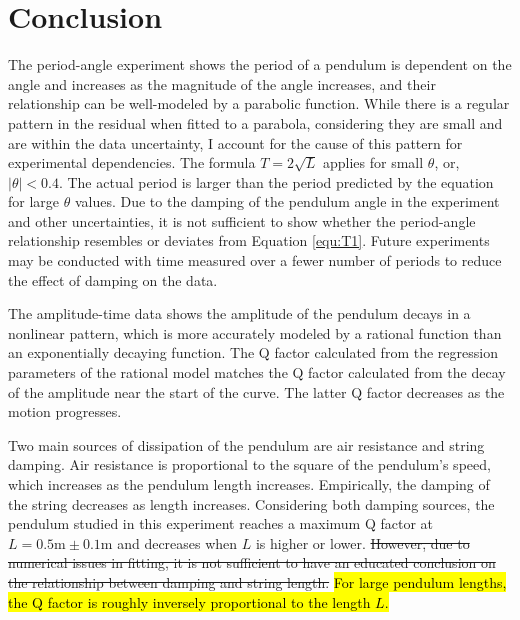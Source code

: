 \documentclass[12pt]{article}
\DeclareRobustCommand{\hlnew}[1]{{\sethlcolor{hlcnew}\hl{#1}}}
\DeclareRobustCommand{\hldel}[1]{{\st{#1}}}
\begin{document}
\section{Conclusion}

The period-angle experiment shows the period of a pendulum is dependent on the angle and increases as the magnitude of the angle increases, and their relationship can be well-modeled by a parabolic function. While there is a regular pattern in the residual when fitted to a parabola, considering they are small and are within the data uncertainty, I account for the cause of this pattern for experimental dependencies. The formula $T=2\sqrt{L}$ applies for small $\theta$, or, $|\theta|<0.4$. The actual period is larger than the period predicted by the equation for large $\theta$ values. Due to the damping of the pendulum angle in the experiment and other uncertainties, it is not sufficient to show whether the period-angle relationship resembles or deviates from Equation \ref{equ:T1}. Future experiments may be conducted with time measured over a fewer number of periods to reduce the effect of damping on the data.

The amplitude-time data shows the amplitude of the pendulum decays in a nonlinear pattern, which is more accurately modeled by a rational function than an exponentially decaying function. The Q factor calculated from the regression parameters of the rational model matches the Q factor calculated from the decay of the amplitude near the start of the curve. The latter Q factor decreases as the motion progresses.

Two main sources of dissipation of the pendulum are air resistance and string damping. Air resistance is proportional to the square of the pendulum's speed, which increases as the pendulum length increases. Empirically, the damping of the string decreases as length increases. Considering both damping sources, the pendulum studied in this experiment reaches a maximum Q factor at $L=0.5\mathrm{m}\pm0.1\mathrm{m}$ and decreases when $L$ is higher or lower. \hldel{However, due to numerical issues in fitting, it is not sufficient to have an educated conclusion on the relationship between damping and string length.} \hlnew{For large pendulum lengths, the Q factor is roughly inversely proportional to the length $L$.}
\end{document}
